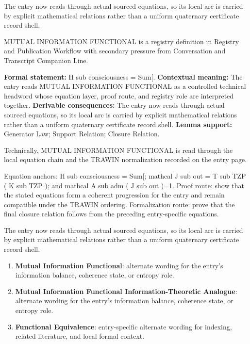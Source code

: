 The entry now reads through actual sourced equations, so its local arc is carried by explicit mathematical relations rather than a uniform quaternary certificate record shell.
\clearpage


\begingroup\small
{}
MUTUAL INFORMATION FUNCTIONAL is a registry definition in Registry and Publication Workflow with secondary pressure from Conversation and Transcript Companion Line.

\begingroup\footnotesize\setlength{\emergencystretch}{3em}\sloppy
\textbf{Formal statement:} H sub consciousness = Sum[. \textbf{Contextual meaning:} The entry reads MUTUAL INFORMATION FUNCTIONAL as a controlled technical headword whose equation layer, proof route, and registry role are interpreted together. \textbf{Derivable consequences:} The entry now reads through actual sourced equations, so its local arc is carried by explicit mathematical relations rather than a uniform quaternary certificate record shell. \textbf{Lemma support:} Generator Law; Support Relation; Closure Relation.\par
\endgroup

Technically, MUTUAL INFORMATION FUNCTIONAL is read through the local equation chain and the TRAWIN normalization recorded on the entry page.

Equation anchors: H sub consciousness = Sum[; mathcal J sub out = T sub TZP ( K sub TZP ); and mathcal A sub adm ( J sub out )=1. Proof route: show that the stated equations form a coherent progression for the entry and remain compatible under the TRAWIN ordering. Formalization route: prove that the final closure relation follows from the preceding entry-specific equations.

The entry now reads through actual sourced equations, so its local arc is carried by explicit mathematical relations rather than a uniform quaternary certificate record shell.
\endgroup

\begin{enumerate}[leftmargin=1.6em,itemsep=6pt,topsep=4pt]
\item \textbf{Mutual Information Functional}: alternate wording for the entry's information balance, coherence state, or entropy role.
\item \textbf{Mutual Information Functional Information-Theoretic Analogue}: alternate wording for the entry's information balance, coherence state, or entropy role.
\item \textbf{Functional Equivalence}: entry-specific alternate wording for indexing, related literature, and local formal context.
\end{enumerate}

